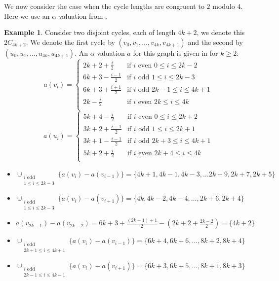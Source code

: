 \documentclass[12pt, a4paper]{article}
\theoremstyle{definition}
\newtheorem{example}[theorem]{Example}
\begin{document}
We now consider the case when the cycle lengths are congruent to $2$ modulo $4$.  Here we use an $\alpha$-valuation from \cite{Kot}.

\begin{example}\label{ex:2C4k+2}
Consider two disjoint cycles, each of length $4k+2$, we denote this $2C_{4k+2}$. We denote the first cycle by $(v_0,v_1,\ldots,v_{4k},v_{4k+1})$ and the second by $(u_0,u_1,\ldots,u_{4k},u_{4k+1})$. An $\alpha$-valuation $a$ for this graph is given in \cite{Kot} for $k \geq 2$:
    \[a(v_i)=
    \begin{cases}
        2k+2+\frac{i}{2} & \text{if } i \text{ even } 0 \leq i \leq 2k-2\\
        6k+3-\frac{i-1}{2} & \text{if } i \text{ odd } 1 \leq i \leq 2k-3\\
        6k+3+\frac{i+1}{2} & \text{if } i \text{ odd } 2k-1 \leq i \leq 4k+1\\
        2k-\frac{i}{2} & \text{if } i \text{ even } 2k \leq i \leq 4k\\
    \end{cases}\]
    \[a(u_i)=
    \begin{cases}
        5k+4-\frac{i}{2} & \text{if } i \text{ even } 0 \leq i \leq 2k+2\\
        3k+2+\frac{i-1}{2} & \text{if } i \text{ odd } 1 \leq i \leq 2k+1\\
        3k+1-\frac{i-1}{2} & \text{if } i \text{ odd } 2k+3 \leq i \leq 4k+1\\
        5k+2+\frac{i}{2} & \text{if } i \text{ even } 2k+4 \leq i \leq 4k\\
    \end{cases}\]
    \begin{itemize}
    \item [(i)] $\cup_{\substack{i \text{ odd} \\ 1 \leq i \leq 2k-3}}\{a(v_i)-a(v_{i-1})\} =\{4k+1,4k-1,4k-3, \ldots 2k+9,2k+7,2k+5\}$
    \item [(ii)]$\cup_{\substack{i \text{ odd } \\ 1 \leq i \leq 2k-3}}\{a(v_i)-a(v_{i+1})\} =\{4k,4k-2,4k-4,\ldots, 2k+6,2k+4\}$
    \item [(iii)]$a(v_{2k-1})-a(v_{2k-2})=6k+3+\frac{(2k-1)+1}{2}-(2k+2+\frac{2k-2}{2})=\{4k+2\}$
    \item [(iv)]$\cup_{\substack{i \text{ odd} \\ 2k+1 \leq i \leq 4k+1}}\{a(v_i)-a(v_{i-1})\} =\{6k+4,6k+6,\ldots, 8k+2,8k+4\}$
    \item [(v)]$\cup_{\substack{i \text{ odd} \\ 2k-1 \leq i \leq 4k-1}}\{a(v_i)-a(v_{i+1})\} = \{6k+3,6k+5,\ldots, 8k+1,8k+3\}$

\end{itemize}
\end{example}
\end{document}
